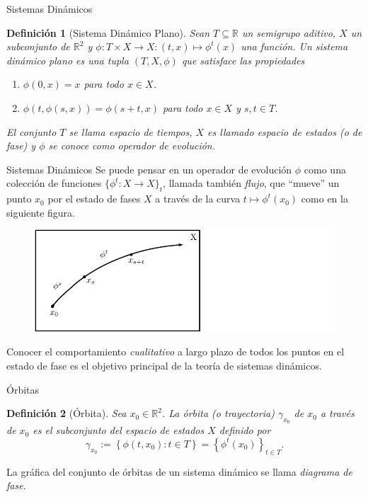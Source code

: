 \documentclass{beamer}
\newtheorem{defi}{Definición}
\renewenvironment{definition}{\begin{defi}}{\end{defi}}
\newcommand{\R}{{\ensuremath{\mathbb{R}}}}
\begin{document}
\begin{frame}{Sistemas Dinámicos}
\begin{definition}[Sistema Dinámico Plano]
Sean $T \subseteq \R$ un semigrupo aditivo, $X$ un subconjunto de $\R^2$ y $\phi: T \times X \to X: (t,x) \mapsto \phi^t(x)$ una función. Un \emph{sistema dinámico plano} es una tupla $(T, X, \phi)$ que satisface las propiedades

\begin{enumerate}[(1)]
    \item $\phi \left( 0, x \right) = x$ para todo $x \in
    X$.
    \item $\phi \left( t, \phi \left( s, x \right) \right) = \phi \left(
    s + t, x \right)$ para todo $x \in X$ y $s, t \in T$.
\end{enumerate}

El conjunto $T$ se llama \emph{espacio de tiempos}, $X$ es llamado {\emph{espacio de estados (o de fase)}} y $\phi$ se conoce como {\emph{operador de evoluci\'on}}.
\end{definition}
\end{frame}

\begin{frame}{Sistemas Dinámicos}
Se puede pensar en un operador de evolución $\phi$ como una colección de funciones $\{ \phi^t: X \to X \}_t$, llamada también \emph{flujo}, que ``mueve'' un punto $x_0$ por el estado de fases $X$ a través de la curva $t \mapsto \phi^t(x_0)$ como en la siguiente figura.

\begin{figure}[!ht] \centering
    \includegraphics[scale=0.75]{../figures/evolution-operator.pdf}
\end{figure}

Conocer el comportamiento \emph{cualitativo} a largo plazo de todos los puntos en el estado de fase es el objetivo principal de la teoría de sistemas dinámicos.
\end{frame}

\begin{frame}{Órbitas}
\begin{definition}[Órbita]
Sea $x_0 \in \R^2$. La órbita (o trayectoria) $\gamma_{x_0}$ de $x_0$ a trav\'es de $x_0$ es el subconjunto del espacio de estados $X$ definido por \[ \gamma_{x_0} := \left\{ \phi
     \left( t, x_0 \right) : t \in T \right\} = \left\{ \phi^t \left( x_0
     \right) \right\}_{t \in T} . \]
\end{definition}

La gráfica del conjunto de órbitas de un sistema dinámico se llama \emph{diagrama de fase}.
\end{frame}
\end{document}
